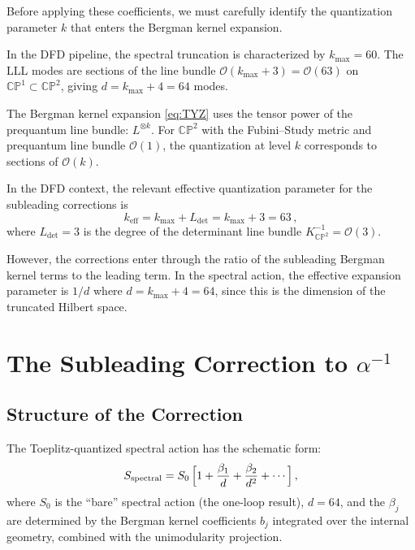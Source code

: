 \documentclass[12pt,a4paper]{article}
\theoremstyle{definition}
\theoremstyle{remark}
\newcommand{\CP}{\mathbb{CP}}
\newcommand{\inv}{^{-1}}
\begin{document}
Before applying these coefficients, we must carefully identify the
quantization parameter $k$ that enters the Bergman kernel expansion.

In the DFD pipeline, the spectral truncation is characterized by
$k_{\max} = 60$. The LLL modes are sections of the line bundle
$\mathcal{O}(k_{\max} + 3) = \mathcal{O}(63)$ on $\CP^1 \subset \CP^2$,
giving $d = k_{\max} + 4 = 64$ modes.

The Bergman kernel expansion \eqref{eq:TYZ} uses the tensor power of the
prequantum line bundle: $L^{\otimes k}$. For $\CP^2$ with the
Fubini--Study metric and prequantum line bundle $\mathcal{O}(1)$, the
quantization at level $k$ corresponds to sections of $\mathcal{O}(k)$.

In the DFD context, the relevant effective quantization parameter for the
subleading corrections is
\begin{equation}
\label{eq:k-eff}
k_{\mathrm{eff}} = k_{\max} + L_{\det} = k_{\max} + 3 = 63\,,
\end{equation}
where $L_{\det} = 3$ is the degree of the determinant line bundle
$K_{\CP^2}^{-1} = \mathcal{O}(3)$.

However, the corrections enter through the ratio of the subleading Bergman
kernel terms to the leading term. In the spectral action, the effective
expansion parameter is $1/d$ where $d = k_{\max} + 4 = 64$, since this is
the dimension of the truncated Hilbert space.

\section{The Subleading Correction to $\alpha\inv$}
\label{sec:correction}

\subsection{Structure of the Correction}

The Toeplitz-quantized spectral action has the schematic form:
\begin{equation}
\label{eq:spectral-action-expansion}
S_{\mathrm{spectral}} = S_0\,\Bigl[1 + \frac{\beta_1}{d}
  + \frac{\beta_2}{d^2} + \cdots\Bigr]\,,
\end{equation}
where $S_0$ is the ``bare'' spectral action (the one-loop result), $d = 64$,
and the $\beta_j$ are determined by the Bergman kernel coefficients $b_j$
integrated over the internal geometry, combined with the unimodularity
projection.
\end{document}
